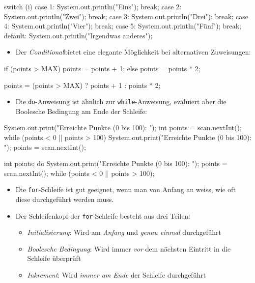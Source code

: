 \documentclass[a4paper,10pt, dvipsnames]{report}
\begin{document}
\begin{javacodebox}
switch (i) {
    case 1: System.out.println("Eins"); break;
    case 2: System.out.println("Zwei"); break;
    case 3: System.out.println("Drei"); break;
    case 4: System.out.println("Vier"); break;
    case 5: System.out.println("Fünf"); break;
    default: System.out.println("Irgendwas anderes");
}
\end{javacodebox}

\begin{itemize}
    \item Der \textit{Conditional}bietet eine elegante Möglichkeit bei alternativen Zuweisungen:
\end{itemize}

\begin{javacodebox}
if (points > MAX)
    points = points + 1;
else
    points = points * 2;
\end{javacodebox}

\begin{javacodebox}
points = (points > MAX) ? points + 1 : points * 2;
\end{javacodebox}

\begin{itemize}
    \item Die \texttt{do}-Anweisung ist ähnlich zur \texttt{while}-Anweisung, evaluiert aber die Boolesche Bedingung am Ende der Schleife:
\end{itemize}

\begin{javacodebox}
System.out.print("Erreichte Punkte (0 bis 100): ");
int points = scan.nextInt();
while (points < 0 || points > 100) {
    System.out.print("Erreichte Punkte (0 bis 100): ");
    points = scan.nextInt();
}
\end{javacodebox}

\begin{javacodebox}
int points;
do {
    System.out.print("Erreichte Punkte (0 bis 100): ");
    points = scan.nextInt();
} while (points < 0 || points > 100);
\end{javacodebox}

\begin{itemize}
    \item Die \texttt{for}-Schleife ist gut geeignet, wenn man von Anfang an weiss, wie oft diese durchgeführt werden muss.
    \item Der Schleifenkopf der \texttt{for}-Schleife besteht aus drei Teilen:
    \begin{itemize}
        \item \textit{Initialisierung}: Wird am \textit{Anfang} und \textit{genau einmal} durchgeführt
        \item \textit{Boolesche Bedingung}: Wird immer \textit{vor} dem nächsten Eintritt in die Schleife überprüft
        \item \textit{Inkrement}: Wird \textit{immer am Ende} der Schleife durchgeführt
    \end{itemize}
\end{itemize}
\end{document}
